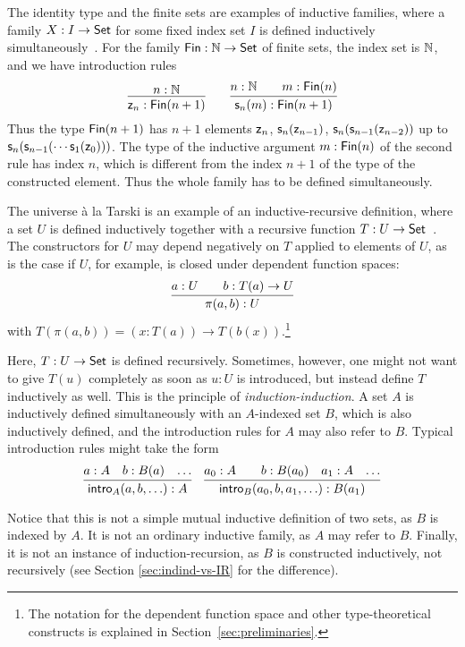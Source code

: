 \documentclass{schwicht}
\begin{document}
The identity type and the finite sets are examples
of inductive families, where a family $X : I \to \mathsf{Set}$ for some fixed
index set $I$ is defined inductively
simultaneously~\cite{dybjer1994indfam}. For the family $\mathsf{Fin} : \mathbb{N}
\to \mathsf{Set}$ of finite sets, the index set is $\mathbb{N}$, and we have
introduction rules
\[
\infer{\finzero{n} : \Fin(n + 1)}{n : \Nat} \qquad
\infer{\finsucc{n}{m} : \Fin(n + 1)}{n : \Nat & \quad m : \Fin(n)}
\]
Thus the type $\mathsf{Fin}(n+1)$ has $n + 1$ elements $\mathsf{z}_{n}$,
$\mathsf{s}_{n}(\mathsf{z}_{n-1})$,
$\mathsf{s}_{n}(\mathsf{s}_{n-1}(\mathsf{z}_{n-2}))$ up to
$\mathsf{s}_{n}(\mathsf{s}_{n-1}(\cdots\mathsf{s}_{1}(\mathsf{z}_{0})))$.
The type of the inductive argument $m : \mathsf{Fin}(n)$ of the second rule
has index $n$, which is different from the index $n + 1$ of the type
of the constructed element. Thus the whole family has to be defined
simultaneously.

The universe \`a la Tarski is an example of an inductive-recursive
definition, where a set $U$ is defined inductively together with a
recursive function $T : U \to \mathsf{Set}$~\cite{dybjer2000IR}.  The
constructors for $U$ may depend negatively on $T$ applied to elements
of $U$, as is the case if $U$, for example, is closed under dependent
function spaces:
\[
\infer{\pi(a, b) : U}{a : U & \quad b : T(a) \to U}
\]
with $T(\pi(a, b)) = (x : T(a)) \to T(b(x))$.\footnote{The notation
  for the dependent function space and other type-theoretical
  constructs is explained in Section~\ref{sec:preliminaries}.}

Here, $T : U \to \mathsf{Set}$ is defined recursively. Sometimes, however, one
might not want to give $T(u)$ completely as soon as $u : U$ is
introduced, but instead define $T$ inductively as well. This is the
principle of \emph{induction-induction}. A set $A$ is inductively
defined simultaneously with an $A$-indexed set $B$, which is also
inductively defined, and the introduction rules for $A$ may also refer
to $B$. Typical introduction rules might take the form
\[ \infer{\intro{A}(a, b, \ldots) : A}{a : A &b : B(a) & \ldots} \quad
\infer{\intro{B}(a_0, b, a_1, \ldots) : B(a_1)}{a_0 : A &
&b : B(a_0) & a_1 : A & \ldots} \]

Notice that this is not a simple mutual inductive definition of two
sets, as $B$ is indexed by $A$. It is not an ordinary inductive
family, as $A$ may refer to $B$. Finally, it is not an instance of
induction-recursion, as $B$ is constructed inductively, not
recursively (see Section \ref{sec:indind-vs-IR} for the difference).
\end{document}
